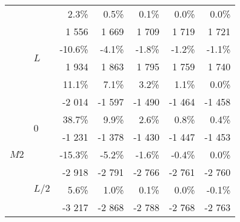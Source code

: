 {{{\begin{tabularx}{0.65\textwidth}{@{} XX rrrrr@{}}
					&&{\color{black}\scriptsize2.3\%}&{\color{black}\scriptsize0.5\%}&{\color{black}\scriptsize0.1\%}&{\color{black}\scriptsize0.0\%}&{\color{black}\scriptsize0.0\%}\\\cmidrule[0.5\cmidrulewidth]{2-7}
					&\multirow{4}{*}{$L$}&{\color{Tblue}\normalsize1 556}&{\color{Tblue}\normalsize1 669}&{\color{Tblue}\normalsize1 709}&{\color{Tblue}\normalsize1 719}&{\color{Tblue}\normalsize1 721}\\
					&&{\color{Tblue}\scriptsize-10.6\%}&{\color{Tblue}\scriptsize-4.1\%}&{\color{Tblue}\scriptsize-1.8\%}&{\color{Tblue}\scriptsize-1.2\%}&{\color{Tblue}\scriptsize-1.1\%}\\
					&&{\color{black}\normalsize1 934}&{\color{black}\normalsize1 863}&{\color{black}\normalsize1 795}&{\color{black}\normalsize1 759}&{\color{black}\normalsize1 740}\\
					&&{\color{black}\scriptsize11.1\%}&{\color{black}\scriptsize7.1\%}&{\color{black}\scriptsize3.2\%}&{\color{black}\scriptsize1.1\%}&{\color{black}\scriptsize0.0\%}\\\midrule
					\multirow{12}{*}{$M2$}&\multirow{4}{*}{$0$}&{\color{Tblue}\normalsize-2 014}&{\color{Tblue}\normalsize-1 597}&{\color{Tblue}\normalsize-1 490}&{\color{Tblue}\normalsize-1 464}&{\color{Tblue}\normalsize-1 458}\\
					&&{\color{Tblue}\scriptsize38.7\%}&{\color{Tblue}\scriptsize9.9\%}&{\color{Tblue}\scriptsize2.6\%}&{\color{Tblue}\scriptsize0.8\%}&{\color{Tblue}\scriptsize0.4\%}\\
					&&{\color{black}\normalsize-1 231}&{\color{black}\normalsize-1 378}&{\color{black}\normalsize-1 430}&{\color{black}\normalsize-1 447}&{\color{black}\normalsize-1 453}\\
					&&{\color{black}\scriptsize-15.3\%}&{\color{black}\scriptsize-5.2\%}&{\color{black}\scriptsize-1.6\%}&{\color{black}\scriptsize-0.4\%}&{\color{black}\scriptsize0.0\%}\\\cmidrule[0.5\cmidrulewidth]{2-7}
					&\multirow{4}{*}{$L/2$}&{\color{Tblue}\normalsize-2 918}&{\color{Tblue}\normalsize-2 791}&{\color{Tblue}\normalsize-2 766}&{\color{Tblue}\normalsize-2 761}&{\color{Tblue}\normalsize-2 760}\\
					&&{\color{Tblue}\scriptsize5.6\%}&{\color{Tblue}\scriptsize1.0\%}&{\color{Tblue}\scriptsize0.1\%}&{\color{Tblue}\scriptsize0.0\%}&{\color{Tblue}\scriptsize-0.1\%}\\
					&&{\color{black}\normalsize-3 217}&{\color{black}\normalsize-2 868}&{\color{black}\normalsize-2 788}&{\color{black}\normalsize-2 768}&{\color{black}\normalsize-2 763}\\

\end{tabularx}}}}

